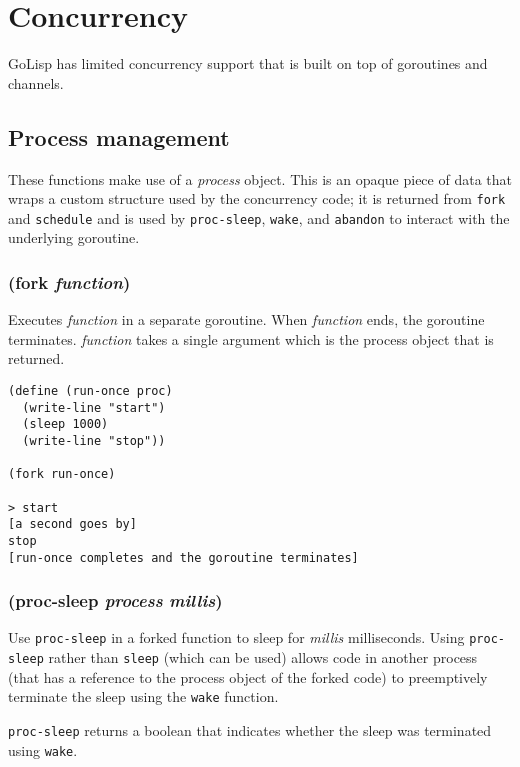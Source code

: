 \documentclass{article}
\begin{document}
\section{Concurrency}\label{sec:concurrency}

GoLisp has limited concurrency support that is built on top of goroutines and channels.

\subsection{Process management}\label{sec:process-management}

These functions make use of a \emph{process} object. This is an opaque piece of data that
wraps a custom structure used by the concurrency code; it is returned from \verb|fork| and
\verb|schedule| and is used by \verb|proc-sleep|, \verb|wake|, and \verb|abandon| to
interact with the underlying goroutine.

\subsubsection{(fork \emph{function})}

Executes \emph{function} in a separate goroutine. When \emph{function} ends, the goroutine
terminates. \emph{function} takes a single argument which is the process object that is
returned.

\begin{verbatim}
(define (run-once proc)
  (write-line "start")
  (sleep 1000)
  (write-line "stop"))

(fork run-once)

> start
[a second goes by]
stop
[run-once completes and the goroutine terminates]
\end{verbatim}

\subsubsection{(proc-sleep \emph{process} \emph{millis})}

Use \verb|proc-sleep| in a forked function to sleep for \emph{millis} milliseconds. Using
\verb|proc-sleep| rather than \verb|sleep| (which can be used) allows code in another
process (that has a reference to the process object of the forked code) to preemptively
terminate the sleep using the \verb|wake| function.

\verb|proc-sleep| returns a boolean that indicates whether the sleep was terminated using
\verb|wake|.
\end{document}
